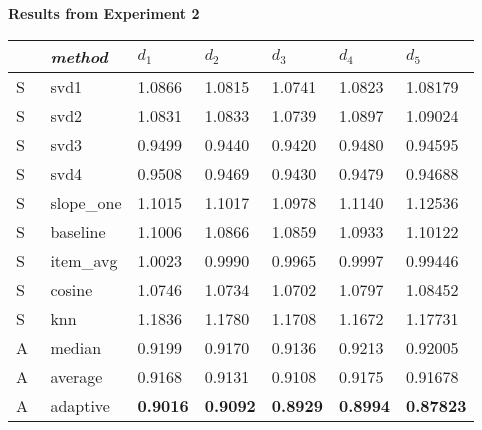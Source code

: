 \begin{table}[p]
  \centering

  \textbf{Results from Experiment 2}

  \vspace{3em}

  \begin{tabular*}{\textwidth}{ l p{3cm} p{1.5cm} p{1.5cm} p{1.5cm} p{1.5cm} p{1.5cm} }
    \toprule
      ~ & \emph{method} & 
      $d_1$ & $d_2$ & $d_3$ & $d_4$ & $d_5$ \\ 
    \midrule
S & svd1       &  1.0866  &  1.0815  &  1.0741  &  1.0823  &  1.08179  \\
S & svd2       &  1.0831  &  1.0833  &  1.0739  &  1.0897  &  1.09024  \\
S & svd3       &  0.9499  &  0.9440  &  0.9420  &  0.9480  &  0.94595  \\
S & svd4       &  0.9508  &  0.9469  &  0.9430  &  0.9479  &  0.94688  \\
S & slope\_one &  1.1015  &  1.1017  &  1.0978  &  1.1140  &  1.12536  \\
S & baseline   &  1.1006  &  1.0866  &  1.0859  &  1.0933  &  1.10122  \\
S & item\_avg  &  1.0023  &  0.9990  &  0.9965  &  0.9997  &  0.99446  \\
S & cosine     &  1.0746  &  1.0734  &  1.0702  &  1.0797  &  1.08452  \\
S & knn        &  1.1836  &  1.1780  &  1.1708  &  1.1672  &  1.17731  \\
\midrule
A & median     &  0.9199  &  0.9170  &  0.9136  &  0.9213  &  0.92005  \\
A & average    &  0.9168  &  0.9131  &  0.9108  &  0.9175  &  0.91678  \\
A & adaptive    &  \textbf{0.9016}  &  \textbf{0.9092}  &  \textbf{0.8929}  &  \textbf{0.8994}  &  \textbf{0.87823}  \\
    \bottomrule
  \end{tabular*}

  \vspace{3em}


\end{table}
